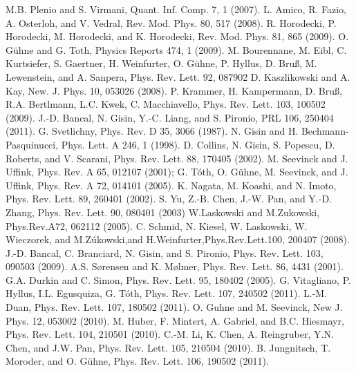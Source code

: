 \begin{thebibliography}{}
 M.B. Plenio and S. Virmani, Quant. Inf. Comp. 7, 1 (2007).
 L. Amico, R. Fazio, A. Osterloh, and V. Vedral, Rev. Mod. Phys. 80, 517 (2008).
 R. Horodecki, P. Horodecki, M. Horodecki, and K. Horodecki, Rev. Mod. Phys. 81, 865 (2009).
 O. G\"uhne and G. Toth, Physics Reports 474, 1 (2009).
 M. Bourennane, M. Eibl, C. Kurtsiefer, S. Gaertner, H. Weinfurter, O. G\"uhne, P. Hyllus, D. Bruß, M. Lewenstein, and A. Sanpera, Phys. Rev. Lett. 92, 087902
 D. Kaszlikowski and A. Kay, New. J. Phys. 10, 053026 (2008).
 P. Krammer, H. Kampermann, D. Bruß, R.A. Bertlmann, L.C. Kwek, C. Macchiavello, Phys. Rev. Lett. 103, 100502 (2009).
 J.-D. Bancal, N. Gisin, Y.-C. Liang, and S. Pironio, PRL 106, 250404 (2011).
 G. Svetlichny, Phys. Rev. D 35, 3066 (1987).
 N. Gisin and H. Bechmann-Pasquinucci, Phys. Lett. A 246, 1 (1998).
 D. Collins, N. Gisin, S. Popescu, D. Roberts, and V. Scarani, Phys. Rev. Lett. 88, 170405 (2002).
 M. Seevinck and J. Uffink, Phys. Rev. A 65, 012107 (2001);
 G. T\'oth, O. G\"uhne, M. Seevinck, and J. Uffink, Phys. Rev. A 72, 014101 (2005).
 K. Nagata, M. Koashi, and N. Imoto, Phys. Rev. Lett. 89, 260401 (2002).
 S. Yu, Z.-B. Chen, J.-W. Pan, and Y.-D. Zhang, Phys. Rev. Lett. 90, 080401 (2003)
 W.Laskowski and M.Zukowski, Phys.Rev.A72, 062112 (2005).
 C. Schmid, N. Kiesel, W. Laskowski, W. Wieczorek, and M.Z\'ukowski,and H.Weinfurter,Phys.Rev.Lett.100, 200407 (2008).
 J.-D. Bancal, C. Branciard, N. Gisin, and S. Pironio, Phys. Rev. Lett. 103, 090503 (2009).
 A.S. Sørensen and K. Mølmer, Phys. Rev. Lett. 86, 4431 (2001).
 G.A. Durkin and C. Simon, Phys. Rev. Lett. 95, 180402 (2005).
 G. Vitagliano, P. Hyllus, I.L. Egusquiza, G. T\'oth, Phys. Rev. Lett. 107, 240502 (2011).
 L.-M. Duan, Phys. Rev. Lett. 107, 180502 (2011).
 O. Guhne and M. Seevinck, New J. Phys. 12, 053002 (2010).
 M. Huber, F. Mintert, A. Gabriel, and B.C. Hiesmayr, Phys. Rev. Lett. 104, 210501 (2010).
 C.-M. Li, K. Chen, A. Reingruber, Y.N. Chen, and J.W. Pan, Phys. Rev. Lett. 105, 210504 (2010).
 B. Jungnitsch, T. Moroder, and O. G\"uhne, Phys. Rev. Lett. 106, 190502 (2011).

\end{thebibliography}
